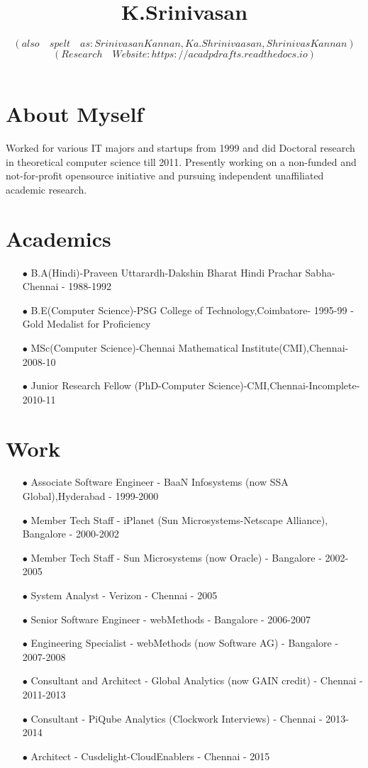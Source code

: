 \documentclass[11pt,onecolumn]{article}
\author{ $ (also \quad spelt \quad as: Srinivasan Kannan, Ka.Shrinivaasan, Shrinivas Kannan)$ \\
$ (Research \quad Website: https://acadpdrafts.readthedocs.io) $ \\
}
\title{K.Srinivasan}
\date{}
\begin{document}
\thispagestyle{empty}
\pagestyle{empty}
\maketitle

\section{About Myself}
Worked for various IT majors and startups from 1999 and did Doctoral research in theoretical computer science till 2011. Presently working on a non-funded and not-for-profit opensource initiative and pursuing independent unaffiliated academic research.

\section{Academics}
\begin{enumerate}
\item[$\bullet$] B.A(Hindi)-Praveen Uttarardh-Dakshin Bharat Hindi Prachar Sabha-Chennai - 1988-1992
\item[$\bullet$] B.E(Computer Science)-PSG College of Technology,Coimbatore- 1995-99 - Gold Medalist for Proficiency
\item[$\bullet$] MSc(Computer Science)-Chennai Mathematical Institute(CMI),Chennai- 2008-10
\item[$\bullet$] Junior Research Fellow (PhD-Computer Science)-CMI,Chennai-Incomplete- 2010-11
\end{enumerate}

\section{Work}
\begin{enumerate}
\item[$\bullet$] Associate Software Engineer - BaaN Infosystems (now SSA Global),Hyderabad - 1999-2000
\item[$\bullet$] Member Tech Staff - iPlanet (Sun Microsystems-Netscape Alliance), Bangalore - 2000-2002
\item[$\bullet$] Member Tech Staff - Sun Microsystems (now Oracle) - Bangalore - 2002-2005
\item[$\bullet$] System Analyst - Verizon - Chennai - 2005
\item[$\bullet$] Senior Software Engineer - webMethods - Bangalore - 2006-2007
\item[$\bullet$] Engineering Specialist - webMethods (now Software AG) - Bangalore - 2007-2008
\item[$\bullet$] Consultant and Architect - Global Analytics (now GAIN credit) - Chennai - 2011-2013
\item[$\bullet$] Consultant - PiQube Analytics (Clockwork Interviews) - Chennai - 2013-2014
\item[$\bullet$] Architect - Cusdelight-CloudEnablers - Chennai - 2015
\end{enumerate}
\end{document}
